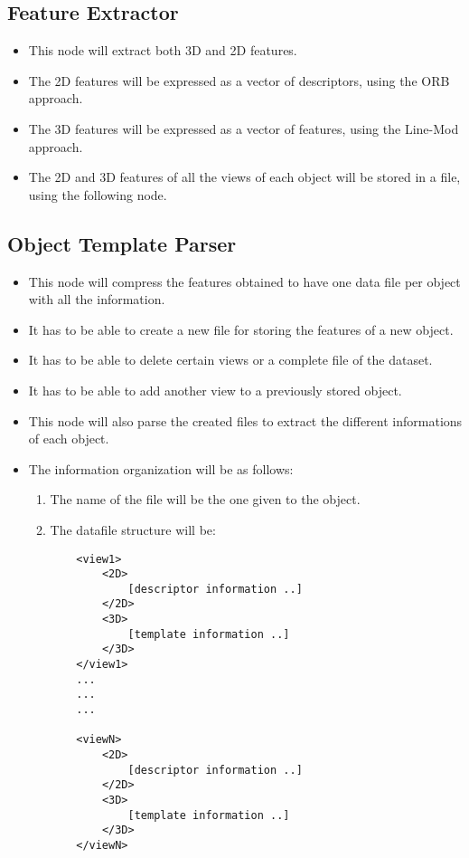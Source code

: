 \documentclass{article}
\begin{document}
\subsection{Feature Extractor}
\begin{itemize}
\item This node will extract both 3D and 2D features. 
\item The 2D features will be expressed as a vector of descriptors, using the ORB approach. 
\item The 3D features will be expressed as a vector of features, using the Line-Mod approach.
\item The 2D and 3D features of all the views of each object will be stored in a file, using the following node.  
\end{itemize}

\subsection{Object Template Parser}
\begin{itemize}
\item This node will compress the features obtained to have one data file per object with all the information.
 
\item It has to be able to create a new file for storing the features of a new object. 
\item It has to be able to delete certain views or a complete file of the dataset. 
\item It has to be able to add another view to a previously stored object. 

\item This node will also parse the created files to extract the different informations of each object. 

\item The information organization will be as follows: 
	\begin{enumerate}
	\item The name of the file will be the one given to the object. 
	\item The datafile structure will be: \\
		\begin{lstlisting}
	<view1>
		<2D>
			[descriptor information ..]
		</2D>
		<3D>
			[template information ..]
		</3D>
	</view1>	
	...
	...
	...		
			
	<viewN>
		<2D>
			[descriptor information ..]
		</2D>
		<3D>
			[template information ..]
		</3D>
	</viewN>	
		
		\end{lstlisting}
	\end{enumerate}
	
\end{itemize}
\end{document}
